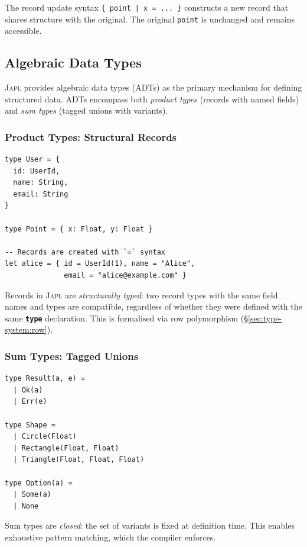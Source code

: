 \documentclass[11pt]{article}
\theoremstyle{definition}
\theoremstyle{remark}
\newcommand{\japl}{\textsc{Japl}}
\newcommand{\keyword}[1]{\texttt{\textbf{#1}}}
\begin{document}
The record update syntax \texttt{\{ point | x = ... \}} constructs a
new record that shares structure with the original.  The original
\texttt{point} is unchanged and remains accessible.

\subsection{Algebraic Data Types}
\label{sec:japl:adt}

\japl{} provides algebraic data types (ADTs) as the primary mechanism
for defining structured data.  ADTs encompass both \emph{product types}
(records with named fields) and \emph{sum types} (tagged unions with
variants).

\subsubsection{Product Types: Structural Records}

\begin{lstlisting}[caption={Record types in \japl{}.}]
type User = {
  id: UserId,
  name: String,
  email: String
}

type Point = { x: Float, y: Float }

-- Records are created with `=` syntax
let alice = { id = UserId(1), name = "Alice",
              email = "alice@example.com" }
\end{lstlisting}

Records in \japl{} are \emph{structurally typed}: two record types with
the same field names and types are compatible, regardless of whether
they were defined with the same \keyword{type} declaration.  This is
formalised via row polymorphism (\S\ref{sec:type-system:row}).

\subsubsection{Sum Types: Tagged Unions}

\begin{lstlisting}[caption={Sum types in \japl{}.}]
type Result(a, e) =
  | Ok(a)
  | Err(e)

type Shape =
  | Circle(Float)
  | Rectangle(Float, Float)
  | Triangle(Float, Float, Float)

type Option(a) =
  | Some(a)
  | None
\end{lstlisting}

Sum types are \emph{closed}: the set of variants is fixed at definition
time.  This enables exhaustive pattern matching, which the compiler
enforces.
\end{document}
